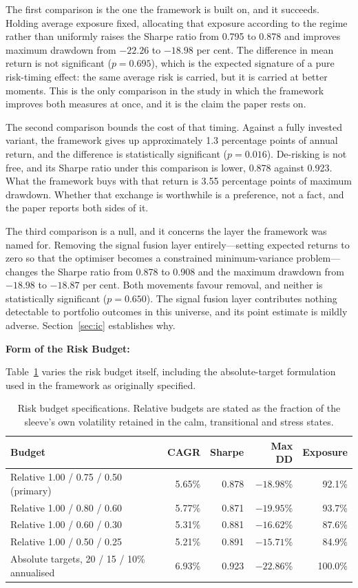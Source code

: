 \documentclass{singlecol-new}
\theoremstyle{TH}{
\newtheorem{lemma}{Lemma}
\newtheorem{theorem}[lemma]{Theorem}
\newtheorem{corrolary}[lemma]{Corrolary}
\newtheorem{conjecture}[lemma]{Conjecture}
\newtheorem{proposition}[lemma]{Proposition}
\newtheorem{claim}[lemma]{Claim}
\newtheorem{stheorem}[lemma]{Wrong Theorem}
\newtheorem{algorithm}{Algorithm}
}
\theoremstyle{THrm}{
\newtheorem{definition}{Definition}[section]
\newtheorem{question}{Question}[section]
\newtheorem{remark}{Remark}
\newtheorem{scheme}{Scheme}
}
\theoremstyle{THhit}{
\newtheorem{case}{Case}[section]
}
\begin{document}
The first comparison is the one the framework is built on, and it succeeds. Holding
average exposure fixed, allocating that exposure according to the regime rather than
uniformly raises the Sharpe ratio from 0.795 to 0.878 and improves maximum drawdown from
$-22.26$ to $-18.98$ per cent. The difference in mean return is not significant
($p = 0.695$), which is the expected signature of a pure risk-timing effect: the same
average risk is carried, but it is carried at better moments. This is the only comparison
in the study in which the framework improves both measures at once, and it is the claim
the paper rests on.

The second comparison bounds the cost of that timing. Against a fully invested variant,
the framework gives up approximately 1.3 percentage points of annual return, and the
difference is statistically significant ($p = 0.016$). De-risking is not free, and its
Sharpe ratio under this comparison is lower, 0.878 against 0.923. What the framework buys
with that return is 3.55 percentage points of maximum drawdown. Whether that exchange is
worthwhile is a preference, not a fact, and the paper reports both sides of it.

The third comparison is a null, and it concerns the layer the framework was named for.
Removing the signal fusion layer entirely---setting expected returns to zero so that the
optimiser becomes a constrained minimum-variance problem---changes the Sharpe ratio from
0.878 to 0.908 and the maximum drawdown from $-18.98$ to $-18.87$ per cent. Both
movements favour removal, and neither is statistically significant ($p = 0.650$). The
signal fusion layer contributes nothing detectable to portfolio outcomes in this
universe, and its point estimate is mildly adverse. Section~\ref{sec:ic} establishes why.

\textbf{Form of the Risk Budget:}

Table~\ref{tab:budget} varies the risk budget itself, including the absolute-target
formulation used in the framework as originally specified.

\begin{table}[!ht]
\centering
\caption{Risk budget specifications. Relative budgets are stated as the fraction of the
sleeve's own volatility retained in the calm, transitional and stress states.}
\label{tab:budget}
\footnotesize
\begin{tabular}{p{4.6cm}rrrr}
\hline
\textbf{Budget} & \textbf{CAGR} & \textbf{Sharpe} & \textbf{Max DD} & \textbf{Exposure} \\
\hline
Relative 1.00 / 0.75 / 0.50 (primary) & 5.65\% & 0.878 & $-18.98$\% & 92.1\% \\
Relative 1.00 / 0.80 / 0.60 & 5.77\% & 0.871 & $-19.95$\% & 93.7\% \\
Relative 1.00 / 0.60 / 0.30 & 5.31\% & 0.881 & $-16.62$\% & 87.6\% \\
Relative 1.00 / 0.50 / 0.25 & 5.21\% & 0.891 & $-15.71$\% & 84.9\% \\
Absolute targets, 20 / 15 / 10\% annualised & 6.93\% & 0.923 & $-22.86$\% & 100.0\% \\
\hline
\end{tabular}
\end{table}
\end{document}
